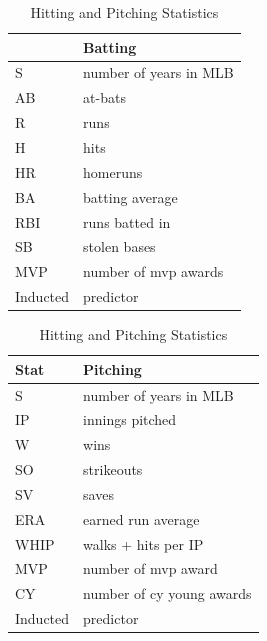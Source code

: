 \documentclass[preprint,12pt]{elsarticle}
\begin{document}
\begin{table}[h]
\begin{tabular}{|l l|}
\hline
 & Batting \\
\hline
	S & number of years in MLB \\
	AB & at-bats \\
	R & runs \\
	H & hits \\
	HR & homeruns \\
	BA & batting average \\
	RBI & runs batted in \\
	SB & stolen bases \\
	MVP & number of mvp awards \\
	Inducted & predictor \\
\hline
\end{tabular}
\quad
\begin{tabular}{|l l|}
\hline
Stat & Pitching\\
\hline
	S & number of years in MLB \\
	IP & innings pitched \\
	W & wins \\
	SO & strikeouts \\
	SV & saves \\
	ERA & earned run average \\
	WHIP & walks + hits per IP \\
	MVP & number of mvp award \\
	CY & number of cy young awards \\
	Inducted & predictor \\
\hline
\end{tabular}
\caption{Hitting and Pitching Statistics}
\end{table}

\end{document}

